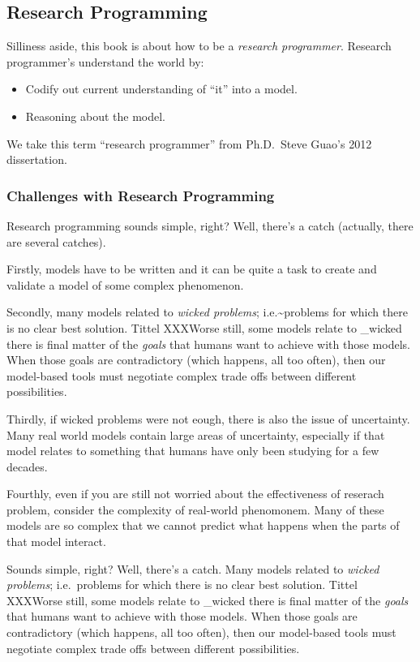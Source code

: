 \subsection{Research Programming}\label{research-programming}

Silliness aside, this book is about how to be a \emph{research
programmer}. Research programmer's understand the world by:

\begin{itemize}
\itemsep1pt\parskip0pt
\item
  Codify out current understanding of ``it'' into a model.
\item
  Reasoning about the model.
\end{itemize}

We take this term ``research programmer'' from Ph.D.~Steve Guao's 2012
dissertation.

\subsubsection{Challenges with Research
Programming}\label{challenges-with-research-programming}

Research programming sounds simple, right? Well, there's a catch
(actually, there are several catches).

Firstly, models have to be written and it can be quite a task to create
and validate a model of some complex phenomenon.

Secondly, many models related to \emph{wicked problems};
i.e.\textasciitilde{}problems for which there is no clear best solution.
Tittel XXXWorse still, some models relate to \_wicked there is final
matter of the \emph{goals} that humans want to achieve with those
models. When those goals are contradictory (which happens, all too
often), then our model-based tools must negotiate complex trade offs
between different possibilities.

Thirdly, if wicked problems were not eough, there is also the issue of
uncertainty. Many real world models contain large areas of uncertainty,
especially if that model relates to something that humans have only been
studying for a few decades.

Fourthly, even if you are still not worried about the effectiveness of
reserach problem, consider the complexity of real-world phenomonem. Many
of these models are so complex that we cannot predict what happens when
the parts of that model interact.

Sounds simple, right? Well, there's a catch. Many models related to
\emph{wicked problems}; i.e.~problems for which there is no clear best
solution. Tittel XXXWorse still, some models relate to \_wicked there is
final matter of the \emph{goals} that humans want to achieve with those
models. When those goals are contradictory (which happens, all too
often), then our model-based tools must negotiate complex trade offs
between different possibilities.

